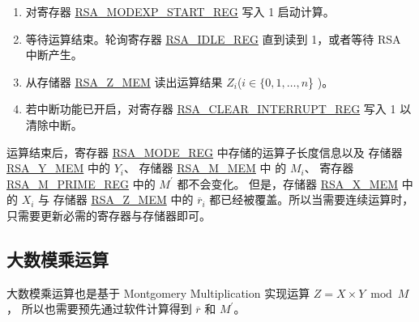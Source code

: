 \documentclass[main\_\_CN.tex]{subfiles}
\begin{document}
\begin{enumerate}
    \item 对寄存器 \hyperref[regdesc:RSAMODEXPSTARTREG]{RSA\_MODEXP\_START\_REG} 写入 1 启动计算。

    \item 等待运算结束。轮询寄存器 \hyperref[regdesc:RSAIDLEREG]{RSA\_IDLE\_REG} 直到读到 1，或者等待 RSA 中断产生。

    \item 从存储器 \hyperref[regdesc:RSAmemory]{RSA\_Z\_MEM} 读出运算结果 \begin{math}Z_{i}\end{math}(\begin{math}i \in \{ 0, 1, \dots, n \end{math}\} )。

    \item 若中断功能已开启，对寄存器 \hyperref[regdesc:RSACLEARINTERRUPTREG]{RSA\_CLEAR\_INTERRUPT\_REG} 写入 1 以清除中断。

\end{enumerate}

运算结束后，寄存器 \hyperref[regdesc:RSAMODEREG]{RSA\_MODE\_REG} 中存储的运算子长度信息以及
存储器 \hyperref[regdesc:RSAmemory]{RSA\_Y\_MEM} 中的 \begin{math}Y_{i}\end{math}、
存储器 \hyperref[regdesc:RSAmemory]{RSA\_M\_MEM} 中 的 \begin{math}M_{i}\end{math}、
寄存器 \hyperref[regdesc:RSAMPRIMEREG]{RSA\_M\_PRIME\_REG} 中的 \begin{math}M^{\prime}\end{math} 都不会变化。
但是，存储器 \hyperref[regdesc:RSAmemory]{RSA\_X\_MEM} 中的 \begin{math}X_{i}\end{math} 与
存储器 \hyperref[regdesc:RSAmemory]{RSA\_Z\_MEM} 中的 \begin{math}\overline{r}_{i}\end{math}
都已经被覆盖。所以当需要连续运算时，只需要更新必需的寄存器与存储器即可。


\subsection{大数模乘运算}

大数模乘运算也是基于 Montgomery Multiplication 实现运算
\begin{math}Z = X \times Y \bmod M\end{math}，
所以也需要预先通过软件计算得到
\begin{math}\overline{r}\end{math} 和
\begin{math}M^{\prime}\end{math}。
\end{document}
